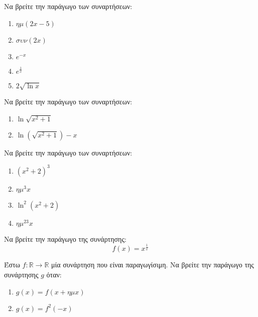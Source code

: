 \documentclass{presentation}
\begin{document}
\begin{askisi}
    Να βρείτε την παράγωγο των συναρτήσεων:
    \begin{enumerate}
        \item<1-> $ημ(2x-5)$
        \item<2-> $συν(2x)$
        \item<3-> $e^{-x}$
        \item<4-> $e^{\frac{1}{x}}$
        \item<5-> $2\sqrt{\ln x}$
    \end{enumerate}

\end{askisi}

\begin{askisi}
    Να βρείτε την παράγωγο των συναρτήσεων:
    \begin{enumerate}
        \item<1-> $\ln \sqrt{x^2+1}$
        \item<2-> $\ln(\sqrt{x^2+1})-x$
    \end{enumerate}

\end{askisi}

\begin{askisi}
    Να βρείτε την παράγωγο των συναρτήσεων:
    \begin{enumerate}
        \item<1-> $(x^2+2)^3$
        \item<2-> $ημ^3x$
        \item<3-> $\ln^2(x^2+2)$
        \item<4-> $ημ^23x$
    \end{enumerate}

\end{askisi}

\begin{askisi}
    Να βρείτε την παράγωγο της συνάρτησης:
    $$f(x)=x^{\frac{1}{x}}$$

\end{askisi}

\begin{askisi}
    Έστω $f:\mathbb{R}\to\mathbb{R}$ μία συνάρτηση που είναι παραγωγίσιμη. Να βρείτε την παράγωγο της συνάρτησης $g$ όταν:
    \begin{enumerate}
        \item<1-> $g(x)=f(x+ημx)$
        \item<2-> $g(x)=f^2(-x)$
    \end{enumerate}

\end{askisi}
\end{document}
